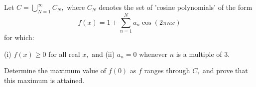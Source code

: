 Let $C=\bigcup_{N=1}^{\infty}C_N,$ where $C_N$ denotes the set of 'cosine polynomials' of the form \[f(x)=1+\sum_{n=1}^Na_n\cos(2\pi nx)\] for which:

(i) $f(x)\ge 0$ for all real $x,$ and
(ii) $a_n=0$ whenever $n$ is a multiple of $3.$

Determine the maximum value of  $f(0)$ as $f$ ranges through $C,$ and prove that this maximum is attained.